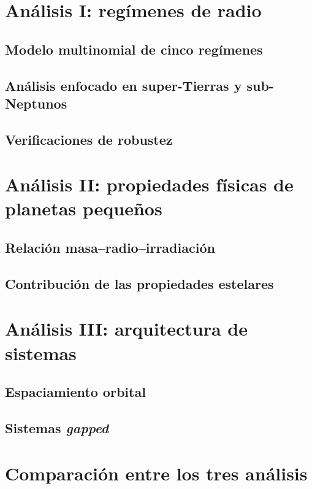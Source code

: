 \section{Análisis I: regímenes de radio}
\label{sec:res-analisis-I}

\subsection{Modelo multinomial de cinco regímenes}
\label{sec:res-multinomial}

\subsection{Análisis enfocado en super-Tierras y sub-Neptunos}
\label{sec:res-zoom}

\subsection{Verificaciones de robustez}
\label{sec:res-robustez-I}

\section{Análisis II: propiedades físicas de planetas pequeños}
\label{sec:res-analisis-II}

\subsection{Relación masa--radio--irradiación}
\label{sec:res-masa-radio}

\subsection{Contribución de las propiedades estelares}
\label{sec:res-contribucion-estelar}

\section{Análisis III: arquitectura de sistemas}
\label{sec:res-analisis-III}

\subsection{Espaciamiento orbital}
\label{sec:res-espaciamiento}

\subsection{Sistemas \textit{gapped}}
\label{sec:res-gapped}

\section{Comparación entre los tres análisis}
\label{sec:res-comparacion}
